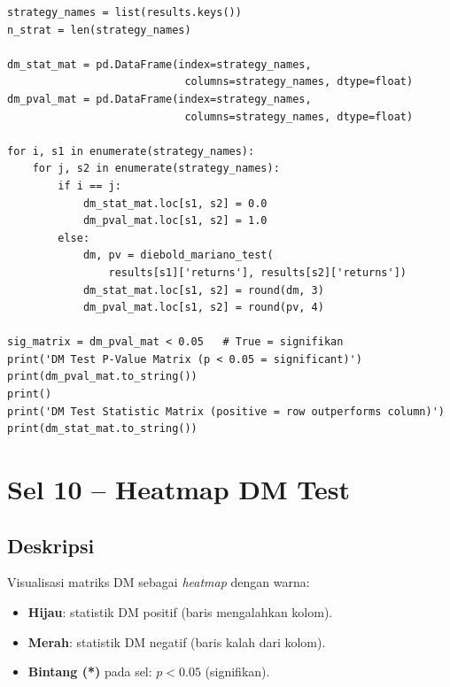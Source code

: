 \documentclass[12pt,a4paper]{article}
\begin{document}
\begin{lstlisting}[caption={Komputasi matriks DM test}]
strategy_names = list(results.keys())
n_strat = len(strategy_names)

dm_stat_mat = pd.DataFrame(index=strategy_names,
                            columns=strategy_names, dtype=float)
dm_pval_mat = pd.DataFrame(index=strategy_names,
                            columns=strategy_names, dtype=float)

for i, s1 in enumerate(strategy_names):
    for j, s2 in enumerate(strategy_names):
        if i == j:
            dm_stat_mat.loc[s1, s2] = 0.0
            dm_pval_mat.loc[s1, s2] = 1.0
        else:
            dm, pv = diebold_mariano_test(
                results[s1]['returns'], results[s2]['returns'])
            dm_stat_mat.loc[s1, s2] = round(dm, 3)
            dm_pval_mat.loc[s1, s2] = round(pv, 4)

sig_matrix = dm_pval_mat < 0.05   # True = signifikan
print('DM Test P-Value Matrix (p < 0.05 = significant)')
print(dm_pval_mat.to_string())
print()
print('DM Test Statistic Matrix (positive = row outperforms column)')
print(dm_stat_mat.to_string())
\end{lstlisting}

\section{Sel 10 -- Heatmap DM Test}

\subsection{Deskripsi}
Visualisasi matriks DM sebagai \textit{heatmap} dengan warna:
\begin{itemize}
    \item \textbf{Hijau}: statistik DM positif (baris mengalahkan kolom).
    \item \textbf{Merah}: statistik DM negatif (baris kalah dari kolom).
    \item \textbf{Bintang (*)} pada sel: $p < 0.05$ (signifikan).
\end{itemize}
\end{document}
